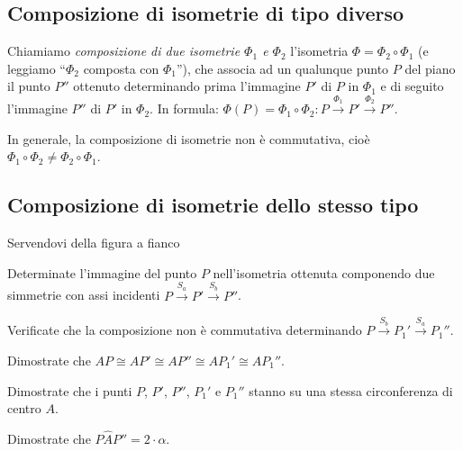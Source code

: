 \subsection{Composizione di isometrie di tipo diverso}
  
  
\begin{definizione}
Chiamiamo \emph{composizione di due isometrie $\Phi_1$ e $\Phi_2$} 
l'isometria $\Phi = \Phi_2 \circ \Phi_1$ (e leggiamo ``$\Phi_2$ 
composta con $\Phi_1$''), che associa ad un qualunque punto $P$ del 
piano il punto $P''$ ottenuto determinando prima l'immagine $P'$ di 
$P$ in $\Phi_1$ e di seguito l'immagine $P''$ di $P'$ in $\Phi_2$. In 
formula: $\Phi(P)=\Phi_1 \circ \Phi_2:P\overset{\Phi_1}\rightarrow P' 
\overset{\Phi_2}\rightarrow P''$.
\end{definizione}

In generale, la composizione di isometrie non è commutativa, cioè 
$\Phi_1\circ\Phi_2 \neq \Phi_2\circ\Phi_1$.
      
      
\subsection{Composizione di isometrie dello stesso tipo}

\begin{exrig}
\noindent\begin{minipage}{0.6\textwidth}\parindent15pt
\begin{esempio}
Servendovi della figura a fianco
\begin{itemize*}
\item Determinate l'immagine del punto $P$ nell'isometria ottenuta 
componendo due simmetrie con assi incidenti 
$P\overset{S_a}\rightarrow P' \overset{S_b}\rightarrow P''$.
\item Verificate che la composizione non è commutativa determinando 
$P\overset{S_b}\rightarrow P_1' \overset{S_a}\rightarrow P_1''$.
\item Dimostrate che $AP \cong AP'\cong AP''\cong AP_1' \cong AP_1''$.
\item Dimostrate che i punti $P$, $P'$, $P''$, $P_1'$ e $P_1''$ 
stanno su una stessa circonferenza di centro $A$.
\item Dimostrate che $P\widehat{A}P''=2\cdot \alpha$.
\end{itemize*}
\end{esempio}
\end{minipage}\hfil
\begin{minipage}{0.4\textwidth}
  \centering
\end{minipage}\vspace{5pt}
\end{exrig}
      
